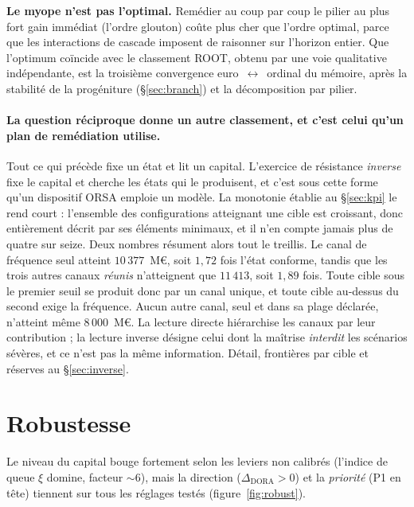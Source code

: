 \begin{cle}
\textbf{Le myope n'est pas l'optimal.} Remédier au coup par coup le pilier au plus fort gain
immédiat (l'ordre glouton) coûte plus cher que l'ordre optimal, parce que les interactions de
cascade imposent de raisonner sur l'horizon entier. Que l'optimum coïncide avec le classement
ROOT, obtenu par une voie qualitative indépendante, est la troisième convergence
euro~$\leftrightarrow$~ordinal du mémoire, après la stabilité de la progéniture
(\S\ref{sec:branch}) et la décomposition par pilier.
\end{cle}

\paragraph{La question réciproque donne un autre classement, et c'est celui qu'un plan de
remédiation utilise.} Tout ce qui précède fixe un état et lit un capital. L'exercice de
résistance \emph{inverse} fixe le capital et cherche les états qui le produisent, et c'est sous
cette forme qu'un dispositif ORSA emploie un modèle. La monotonie établie au \S\ref{sec:kpi} le
rend court : l'ensemble des configurations atteignant une cible est croissant, donc entièrement
décrit par ses éléments minimaux, et il n'en compte jamais plus de quatre sur seize. Deux nombres
résument alors tout le treillis. Le canal de fréquence seul atteint $10\,377$~M\euro,
soit $1{,}72$ fois l'état conforme, tandis que les trois autres canaux \emph{réunis} n'atteignent
que $11\,413$, soit $1{,}89$ fois. Toute cible sous le premier seuil se produit donc par un canal
unique, et toute cible au-dessus du second exige la fréquence. Aucun autre canal, seul et
dans sa plage déclarée, n'atteint même $8\,000$~M\euro. La lecture directe hiérarchise les canaux
par leur contribution ; la lecture inverse désigne celui dont la maîtrise \emph{interdit} les
scénarios sévères, et ce n'est pas la même information. Détail, frontières par cible et réserves
au \S\ref{sec:inverse}.

\section{Robustesse}

Le niveau du capital bouge fortement selon les leviers non calibrés (l'indice de queue $\xi$
domine, facteur $\sim 6$), mais la direction ($\Delta_{\text{DORA}}>0$) et la
\emph{priorité} (P1 en tête) tiennent sur tous les réglages testés (figure~\ref{fig:robust}).

